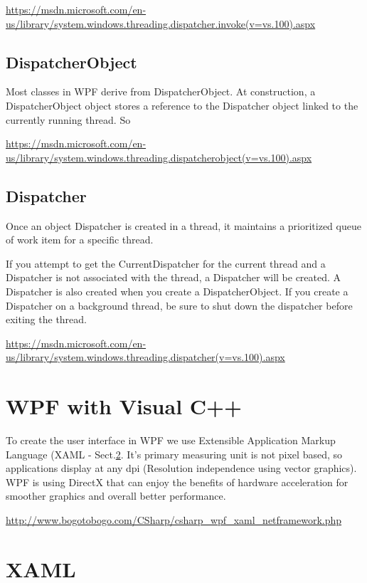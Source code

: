 \url{https://msdn.microsoft.com/en-us/library/system.windows.threading.dispatcher.invoke(v=vs.100).aspx}

\subsection{DispatcherObject}
\label{sec:DispatcherObject_class}

Most classes in WPF derive from DispatcherObject.
At construction, a DispatcherObject object stores a reference to the Dispatcher
object linked to the currently running thread. So

\url{https://msdn.microsoft.com/en-us/library/system.windows.threading.dispatcherobject(v=vs.100).aspx}

\subsection{Dispatcher}
\label{sec:Dispatcher_class}

Once an object Dispatcher is created in a thread, it maintains a prioritized
queue of work item for a specific thread. 

If you attempt to get the CurrentDispatcher for the current thread and a
Dispatcher is not associated with the thread, a Dispatcher will be created. A
Dispatcher is also created when you create a DispatcherObject. If you create a
Dispatcher on a background thread, be sure to shut down the dispatcher before
exiting the thread.

\url{https://msdn.microsoft.com/en-us/library/system.windows.threading.dispatcher(v=vs.100).aspx}

\section{WPF with Visual C++}

To create the user interface in WPF we use Extensible Application Markup
Language (XAML - Sect.\ref{sec:XAML}. It's primary measuring unit is not pixel
based, so applications display at any dpi (Resolution independence using vector graphics).
WPF is using DirectX that can enjoy the benefits of hardware acceleration for
smoother graphics and overall better performance.

\url{http://www.bogotobogo.com/CSharp/csharp_wpf_xaml_netframework.php}

\section{XAML}
\label{sec:XAML}


